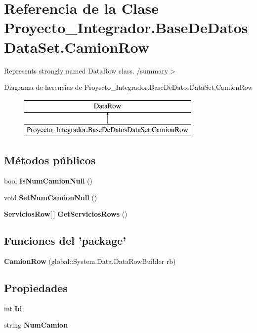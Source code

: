 \section{Referencia de la Clase Proyecto\-\_\-\-Integrador.\-Base\-De\-Datos\-Data\-Set.\-Camion\-Row}
\label{class_proyecto___integrador_1_1_base_de_datos_data_set_1_1_camion_row}


Represents strongly named Data\-Row class. /summary$>$  


Diagrama de herencias de Proyecto\-\_\-\-Integrador.\-Base\-De\-Datos\-Data\-Set.\-Camion\-Row\begin{figure}[H]
\begin{center}
\leavevmode
\includegraphics[height=2.000000cm]{class_proyecto___integrador_1_1_base_de_datos_data_set_1_1_camion_row}
\end{center}
\end{figure}
\subsection*{Métodos públicos}
\begin{DoxyCompactItemize}
\item 
bool {\bf Is\-Num\-Camion\-Null} ()
\item 
void {\bf Set\-Num\-Camion\-Null} ()
\item 
{\bf Servicios\-Row}[$\,$] {\bf Get\-Servicios\-Rows} ()
\end{DoxyCompactItemize}
\subsection*{Funciones del 'package'}
\begin{DoxyCompactItemize}
\item 
{\bf Camion\-Row} (global\-::\-System.\-Data.\-Data\-Row\-Builder rb)
\end{DoxyCompactItemize}
\subsection*{Propiedades}
\begin{DoxyCompactItemize}
\item 
int {\bf Id}\hspace{0.3cm}{\ttfamily  [get, set]}
\item 
string {\bf Num\-Camion}\hspace{0.3cm}{\ttfamily  [get, set]}
\end{DoxyCompactItemize}
